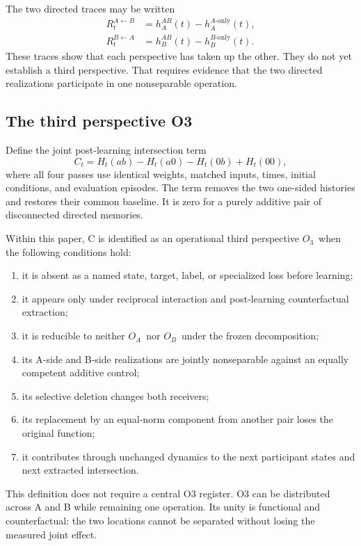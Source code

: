 \documentclass[11pt,a4paper]{article}
\newcommand{\OA}{\ensuremath{O_{A}}}
\newcommand{\OB}{\ensuremath{O_{B}}}
\newcommand{\Othree}{\ensuremath{O_{3}}}
\begin{document}
The two directed traces may be written
\begin{align}
 R_t^{A\leftarrow B}&=h_A^{AB}(t)-h_A^{A\text{-only}}(t),\\
 R_t^{B\leftarrow A}&=h_B^{AB}(t)-h_B^{B\text{-only}}(t).
 \label{eq:directed}
\end{align}
These traces show that each perspective has taken up the other. They do not yet establish a third perspective. That requires evidence that the two directed realizations participate in one nonseparable operation.

\subsection{The third perspective O3}

Define the joint post-learning intersection term
\begin{equation}
 C_t=H_t(ab)-H_t(a0)-H_t(0b)+H_t(00),
 \label{eq:joint}
\end{equation}
where all four passes use identical weights, matched inputs, times, initial conditions, and evaluation episodes. The term removes the two one-sided histories and restores their common baseline. It is zero for a purely additive pair of disconnected directed memories.

Within this paper, C is identified as an operational third perspective \Othree\ when the following conditions hold:
\begin{enumerate}
  \item it is absent as a named state, target, label, or specialized loss before learning;
  \item it appears only under reciprocal interaction and post-learning counterfactual extraction;
  \item it is reducible to neither \OA\ nor \OB\ under the frozen decomposition;
  \item its A-side and B-side realizations are jointly nonseparable against an equally competent additive control;
  \item its selective deletion changes both receivers;
  \item its replacement by an equal-norm component from another pair loses the original function;
  \item it contributes through unchanged dynamics to the next participant states and next extracted intersection.
\end{enumerate}

This definition does not require a central O3 register. O3 can be distributed across A and B while remaining one operation. Its unity is functional and counterfactual: the two locations cannot be separated without losing the measured joint effect.
\end{document}

